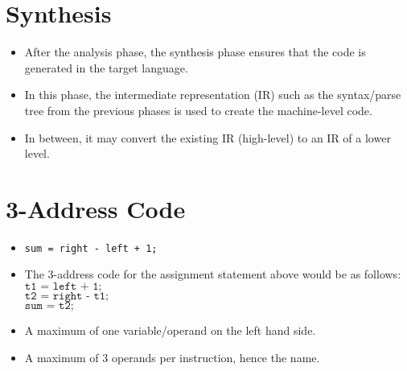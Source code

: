 \documentclass[hidelinks]{article}
\begin{document}
\section{Synthesis}
    \begin{itemize}
        \item After the analysis phase, the synthesis phase ensures that the code is generated in the target language.
        \item In this phase, the intermediate representation (IR) such as the syntax/parse tree from the previous phases is used to create the machine-level code.
        \item In between, it may convert the existing IR (high-level) to an IR of a lower level.
    \end{itemize}
\section{3-Address Code}
    \begin{itemize}
        \item \texttt{sum = right - left + 1;}
        \item The 3-address code for the assignment statement above would be as follows: \\
        $\texttt{t1 = left + 1;}$ \\
        $\texttt{t2 = right - t1;}$ \\
        $\texttt{sum = t2;}$ \\

        \item A maximum of one variable/operand on the left hand side.
        \item A maximum of 3 operands per instruction, hence the name.
    \end{itemize}
\end{document}
